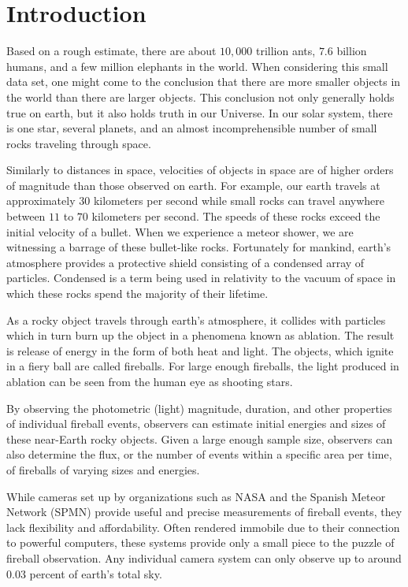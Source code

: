 \chapter{Introduction}

Based on a rough estimate, there are about $10,000$ trillion ants, $7.6$ billion humans, and a few million elephants in the world.  When considering this small data set, one might come to the conclusion that there are more smaller objects in the world than there are larger objects.  This conclusion not only generally holds true on earth, but it also holds truth in our Universe.  In our solar system, there is one star, several planets, and an almost incomprehensible number of small rocks traveling through space. 

Similarly to distances in space, velocities of objects in space are of higher orders of magnitude than those observed on earth.  For example, our earth travels at approximately $30$ kilometers per second while small rocks can travel anywhere between $11$ to $70$ kilometers per second.  The speeds of these rocks exceed the initial velocity of a bullet.  When we experience a meteor shower, we are witnessing a barrage of these bullet-like rocks.  Fortunately for mankind, earth’s atmosphere provides a protective shield consisting of a condensed array of particles.  Condensed is a term being used in relativity to the vacuum of space in which these rocks spend the majority of their lifetime. 

As a rocky object travels through earth’s atmosphere, it collides with particles which in turn burn up the object in a phenomena known as ablation.  The result is release of energy in the form of both heat and light.  The objects, which ignite in a fiery ball are called fireballs.  For large enough fireballs, the light produced in ablation can be seen from the human eye as shooting stars.

By observing the photometric (light) magnitude, duration, and other properties of individual fireball events, observers can estimate initial energies and sizes of these near-Earth rocky objects.  Given a large enough sample size, observers can also determine the flux, or the number of events within a specific area per time, of fireballs of varying sizes and energies.

While cameras set up by organizations such as NASA and the Spanish Meteor Network (SPMN) provide useful and precise measurements of fireball events, they lack flexibility and affordability.  Often rendered immobile due to their connection to powerful computers, these systems provide only a small piece to the puzzle of fireball observation.  Any individual camera system can only observe up to around 0.03 percent of earth’s total sky.  

